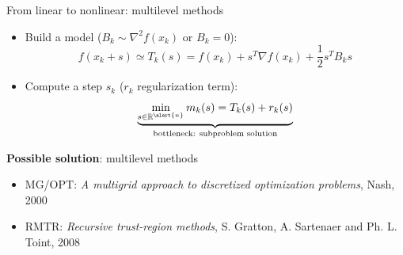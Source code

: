 \documentclass{beamer}
\begin{document}
\begin{frame}{From linear to nonlinear: multilevel methods}
	
	 
	\begin{itemize}
	\item Build a \alert{model} ($B_k\sim \nabla^2 f(x_k)$ or $B_k=0$):
	\begin{equation*}
	f(x_k+s)\simeq T_{k}(s)=f(x_k)+s^T\nabla f(x_k)+\frac{1}{2}s^TB_ks
	\end{equation*}
	\vspace{-0.5cm}
	\item Compute a \alert{step} $s_k$ ($r_k$ regularization term):
	\begin{equation*}
	\underbrace{\min_{s\in\mathbb{R}^{\alert{n}}} m_{k}(s)=T_{k}(s)+r_k(s)}_{\text{bottleneck: subproblem solution}}
	\end{equation*}
	\vspace{-0.5cm}

	\end{itemize}






	
		\vspace{0.5cm}

\pause
\begin{block}{ {\bf Possible solution}:  \alert{multilevel methods} }
		
		\begin{small}
	\begin{itemize}
	\item 
	 \alert{MG/OPT: } \textit{A multigrid approach to discretized optimization problems}, {\color{black} Nash}, {\color{black} 2000}
		\item  \alert{RMTR: } \textit{Recursive trust-region methods}, {\color{black} S. Gratton, A. Sartenaer and  Ph. L. Toint, 2008}

	\end{itemize}
	\end{small}


	\end{block}		
\end{frame}
\end{document}
